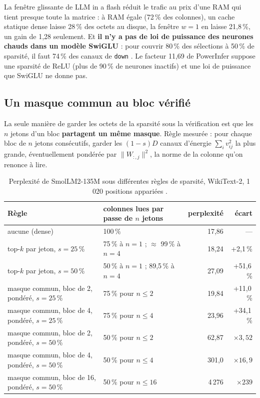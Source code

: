 La fenêtre glissante de LLM in a flash réduit le trafic au prix d'une RAM qui tient presque toute la matrice : à RAM égale (72\,\% des colonnes), un cache statique dense laisse 28\,\% des octets au disque, la fenêtre $w = 1$ en laisse 21,8\,\%, un gain de 1,28 seulement. Et \textbf{il n'y a pas de loi de puissance des neurones chauds dans un modèle SwiGLU} : pour couvrir 80\,\% des sélections à 50\,\% de sparsité, il faut 74\,\% des canaux de \texttt{down} \mes. Le facteur 11,69 de PowerInfer suppose une sparsité de ReLU (plus de 90\,\% de neurones inactifs) et une loi de puissance que SwiGLU ne donne pas.

\subsection{Un masque commun au bloc vérifié}

La seule manière de garder les octets de la sparsité sous la vérification est que les $n$ jetons d'un bloc \textbf{partagent un même masque}. Règle mesurée : pour chaque bloc de $n$ jetons consécutifs, garder les $(1-s)D$ canaux d'énergie $\sum_i v_{ij}^2$ la plus grande, éventuellement pondérée par $\lVert W_{:,j} \rVert^2$, la norme de la colonne qu'on renonce à lire.

\begin{table}[ht]
\centering\small
\caption[Le coût en qualité d'un masque commun]{Perplexité de SmolLM2-135M sous différentes règles de sparsité, WikiText-2, 1\,020 positions appariées \mes.}
\label{tab:masque-commun}
\begin{tabular}{@{}llrr@{}}
\toprule
Règle & colonnes lues par passe de $n$ jetons & perplexité & écart \\
\midrule
aucune (dense) & 100\,\% & 17,86 & --- \\
top-$k$ par jeton, $s = 25$\,\% & 75\,\% à $n=1$ ; $\approx$ 99\,\% à $n=4$ & 18,24 & +2,1\,\% \\
top-$k$ par jeton, $s = 50$\,\% & 50\,\% à $n=1$ ; 89,5\,\% à $n=4$ & 27,09 & +51,6\,\% \\
masque commun, bloc de 2, pondéré, $s = 25$\,\% & 75\,\% pour $n \le 2$ & 19,84 & +11,0\,\% \\
masque commun, bloc de 4, pondéré, $s = 25$\,\% & 75\,\% pour $n \le 4$ & 23,96 & +34,1\,\% \\
masque commun, bloc de 2, pondéré, $s = 50$\,\% & 50\,\% pour $n \le 2$ & 62,87 & $\times3{,}52$ \\
masque commun, bloc de 4, pondéré, $s = 50$\,\% & 50\,\% pour $n \le 4$ & 301,0 & $\times16{,}9$ \\
masque commun, bloc de 16, pondéré, $s = 50$\,\% & 50\,\% pour $n \le 16$ & 4\,276 & $\times239$ \\
\bottomrule
\end{tabular}
\end{table}

